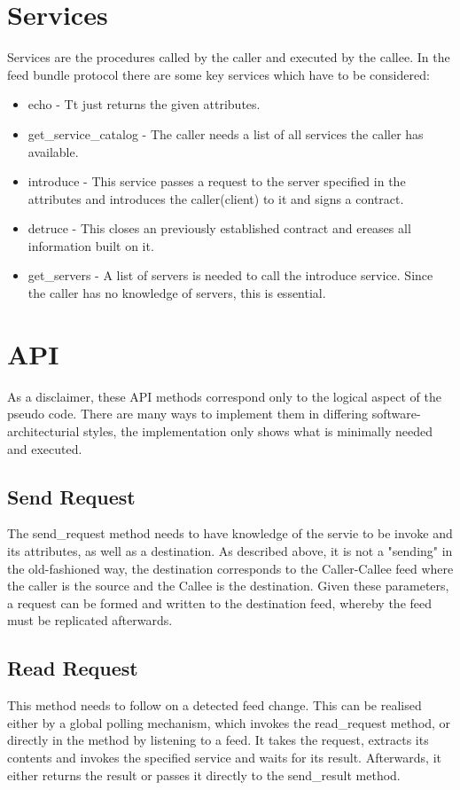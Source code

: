 \section{Services}
Services are the procedures called by the caller and executed by the callee. In the feed bundle protocol there are some key services which have to be considered:
\begin{itemize}
    \item echo - Tt just returns the given attributes.
    \item get\_service\_catalog - The caller needs a list of all services the caller has available.
    \item introduce - This service passes a request to the server specified in the attributes and introduces the caller(client) to it and signs a contract.
    \item detruce - This closes an previously established contract and ereases all information built on it.
    \item get\_servers - A list of servers is needed to call the introduce service. Since the caller has no knowledge of servers, this is essential.
\end{itemize}
\section{API}
As a disclaimer, these API methods correspond only to the logical aspect of the pseudo code. There are many ways to implement them in differing software-architecturial styles, the implementation only shows what is minimally needed and executed.
\subsection{Send Request}


The send\_request method needs to have knowledge of the servie to be invoke and its attributes, as well as a destination. As described above, it is not a "sending" in the old-fashioned way, the destination corresponds to the Caller-Callee feed where the caller is the source and the Callee is the destination. Given these parameters, a request can be formed and written to the destination feed, whereby the feed must be replicated afterwards. 
\subsection{Read Request}

This method needs to follow on a detected feed change. This can be realised either by a global polling mechanism, which invokes the read\_request method, or directly in the method by listening to a feed. It takes the request, extracts its contents and invokes the specified service and waits for its result. Afterwards, it either returns the result or passes it directly to the send\_result method.
